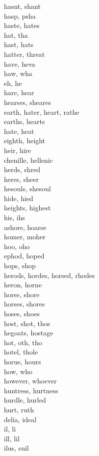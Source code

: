 hasnt, shant\\
hasp, psha\\
haste, hates\\
hat, tha\\
hast, hats\\
hatter, threat\\
have, heva\\
haw, wha\\
eh, he\\
hare, hear\\
hearses, sheares\\
earth, hater, heart, rathe\\
earths, hearts\\
hate, heat\\
eighth, height\\
heir, hire\\
chenille, hellenic\\
herds, shred\\
heres, sheer\\
hesouls, shesoul\\
hide, hied\\
heights, highest\\
his, ihs\\
ashore, hoarse\\
homer, moher\\
hoo, oho\\
ephod, hoped\\
hops, shop\\
herods, hordes, horsed, rhodes\\
heron, horne\\
horse, shore\\
horses, shores\\
hoses, shoes\\
host, shot, thos\\
hegoats, hostage\\
hot, oth, tho\\
hotel, thole\\
horus, hours\\
how, who\\
however, whoever\\
huntress, hurtness\\
hurdle, hurled\\
hurt, ruth\\
delia, ideal\\
il, li\\
ill, lil\\
ilus, suil\\
